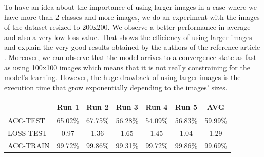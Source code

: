\documentclass[11pt, openany]{report}
\theoremstyle{plain}
\theoremstyle{definition}
\theoremstyle{remark}
\begin{document}
To have an idea about the importance of using larger images in a case where we have more than 2 classes and more images, we do an experiment with the images of the dataset resized to 200x200. We observe a better performance in average and also a very low loss value. That shows the efficiency of using larger images and explain the very good results obtained by the authors of the reference article \cite{leukemia}. Moreover, we can observe that the model arrives to a convergence state as fast as using 100x100 images which means that it is not really constraining for the model's learning. However, the huge drawback of using larger images is the execution time that grow exponentially depending to the images' sizes.  

\begin{center}
\begin{tabular}{|l|c|c|c|c|c|c|}
  \hline
   & \textbf{Run 1} & \textbf{Run 2} & \textbf{Run 3} & \textbf{Run 4} & \textbf{Run 5} & \textbf{AVG}\\
  \hline
  ACC-TEST & 65.02\% & 67.75\% & 56.28\% & 54.09\% & 56.83\% & 59.99\%\\
  LOSS-TEST & 0.97 & 1.36 & 1.65 & 1.45  & 1.04 & 1.29 \\ 
  ACC-TRAIN & 99.72\% & 99.86\% & 99.31\% & 99.72\% & 99.86\% & 99.69\% \\ 
  \hline
\end{tabular}
\label{table:results-C3}
\end{center}
\end{document}
